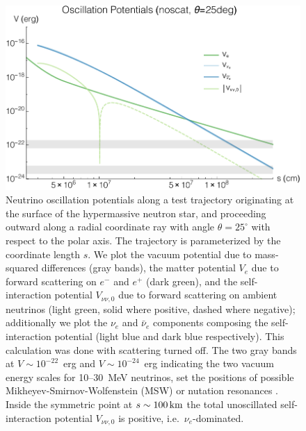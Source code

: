 \documentclass[aps,floatfix,prd,superscriptaddress,twocolumn]{revtex4-1}
\begin{document}
\begin{figure}
  \includegraphics[width=\columnwidth]{20171223-potentials-Ve_Vnue_Vnua_Vnu-000Mo-025deg-noscat}
  \caption{Neutrino oscillation potentials
    along a test trajectory
    originating at the surface of the hypermassive neutron star, and
    proceeding outward along a radial coordinate ray with angle
    $\theta=25^{\circ}$ with respect to the polar axis.
    The trajectory is parameterized by the coordinate length $s$.
    We plot the vacuum potential due to mass-squared differences (gray bands),
    the matter potential $V_e$ due to forward scattering on $e^-$ and $e^+$
    (dark green),
    and the self-interaction potential $V_{\nu\nu,0}$ due to forward
    scattering on ambient neutrinos (light green, solid where positive,
    dashed where negative);
    additionally we plot the $\nu_e$ and $\bar{\nu}_e$ components composing
    the self-interaction potential (light blue and dark blue respectively).
    This calculation was done with scattering turned off.
    The two gray bands at $V\sim10^{-22}$~erg and $V\sim10^{-24}$~erg
    indicating the two vacuum energy scales for 10--30~MeV neutrinos,
    set the positions of possible Mikheyev-Smirnov-Wolfenstein (MSW)
    or nutation resonances \cite{malk2012-mnr_1}.
    Inside the symmetric point at $s\sim100\,{\rm km}$ the total unoscillated
    self-interaction potential $V_{\nu\nu,0}$ is positive,
    i.e.\ $\nu_e$-dominated.
    }
  \label{fig:V_nunu-noscat}
\end{figure}
\end{document}
